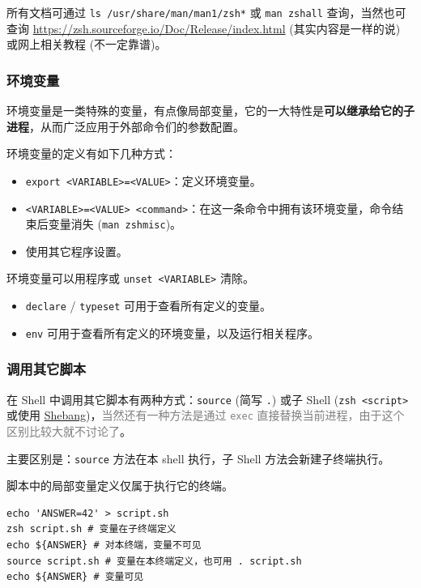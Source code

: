 \documentclass{article}
\begin{document}
	所有文档可通过 \verb!ls /usr/share/man/man1/zsh*! 或 \texttt{man zshall} 查询，当然也可查询 \url{https://zsh.sourceforge.io/Doc/Release/index.html} (其实内容是一样的说) 或网上相关教程 (不一定靠谱)。

	\subsubsection{环境变量}

	环境变量是一类特殊的变量，有点像局部变量，它的一大特性是\textbf{可以继承给它的子进程}，从而广泛应用于外部命令们的参数配置。

	环境变量的定义有如下几种方式：
	\begin{itemize}
		\itemsep0pt
		\item \texttt{export <VARIABLE>=<VALUE>}：定义环境变量。
		\item \texttt{<VARIABLE>=<VALUE> <command>}：在这一条命令中拥有该环境变量，命令结束后变量消失 (\texttt{man zshmisc})。
		\item 使用其它程序设置。
	\end{itemize}

	环境变量可以用程序或 \texttt{unset <VARIABLE>} 清除。

	\begin{itemize}
		\itemsep0pt
		\item \texttt{declare} / \texttt{typeset} 可用于查看所有定义的变量。
		\item \texttt{env} 可用于查看所有定义的环境变量，以及运行相关程序。
	\end{itemize}

	\subsubsection[调用其它脚本]{调用其它脚本\protect\cite{lbwvssl}}

	在 Shell 中调用其它脚本有两种方式：\texttt{source} (简写 \texttt .) 或子 Shell (\texttt{zsh <script>} 或使用 \href{https://en.wikipedia.org/wiki/Shebang_(Unix)}{Shebang})，\textcolor{gray}{当然还有一种方法是通过 \texttt{exec} 直接替换当前进程，由于这个区别比较大就不讨论了}。

	主要区别是：\texttt{source} 方法在本 shell 执行，子 Shell 方法会新建子终端执行。

	脚本中的局部变量定义仅属于执行它的终端。

	\begin{verbatim}
echo 'ANSWER=42' > script.sh
zsh script.sh # 变量在子终端定义
echo ${ANSWER} # 对本终端，变量不可见
source script.sh # 变量在本终端定义，也可用 . script.sh
echo ${ANSWER} # 变量可见
	\end{verbatim}
\end{document}
